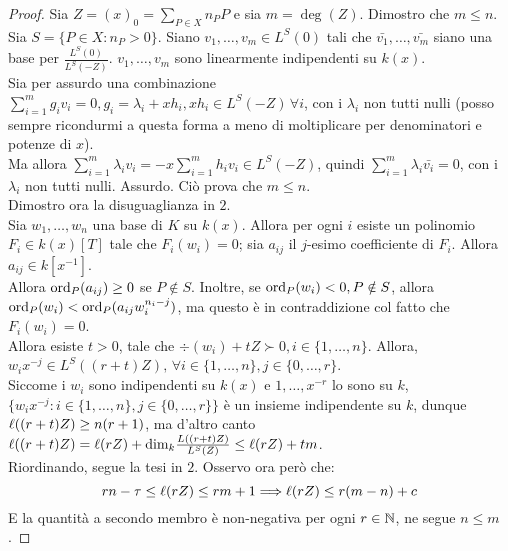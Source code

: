         \begin{proof}
            Sia $Z = (x)_0 = \sum_{P \in X}n_PP$ e sia $m = \deg(Z)$. Dimostro 
            che $m \leq n$. \\
            Sia $S = \{P \in X : n_P > 0\}$. Siano $v_1,\ldots,v_m \in L^S(0)$ 
            tali che $\bar{v_1},\ldots,\bar{v_m}$ siano una base per 
            $\frac{L^S(0)}{L^S(-Z)}$. $v_1,\ldots,v_m$ sono linearmente 
            indipendenti su $k(x)$.\\
            Sia per assurdo una combinazione $\sum_{i=1}^m g_iv_i = 0, g_i = 
            \lambda_i + xh_i, xh_i \in L^S(-Z) \, \forall i$, con i 
            $\lambda_i$ non tutti nulli (posso sempre ricondurmi a questa forma 
            a meno di moltiplicare per denominatori e potenze di $x$). \\
            Ma allora $\sum_{i=1}^m \lambda_i v_i = -x \sum_{i=1}^m h_i v_i 
            \in L^S(-Z)$, quindi $\sum_{i=1}^m \lambda_i \bar{v_i} = 0$, con i 
            $\lambda_i$ non tutti nulli. Assurdo. Ciò prova che $m \leq n$.\\
            Dimostro ora la disuguaglianza in $2$. \\
            Sia $w_1,\ldots,w_n$ una base di $K$ su $k(x)$. Allora per ogni $i$ 
            esiste un polinomio $F_i \in k(x)[T]$ tale che $F_i(w_i) = 0$; sia 
            $a_{ij}$ il $j$-esimo coefficiente di $F_i$. Allora $a_{ij} \in 
            k[x^{-1}]$.\\
            Allora $\text{ord}_P(a_{ij}) \geq 0$ se $P \notin S$. Inoltre, se 
            $\text{ord}_P(w_i) < 0, P \notin S$, allora $\text{ord}_P(w_i) < 
            \text{ord}_P(a_{ij}w_i^{n_i-j})$, ma questo è in contraddizione col 
            fatto che $F_i(w_i) = 0$.\\
            Allora esiste $t > 0$, tale che $\div(w_i) + tZ \succ 0, i \in 
            \{1,\ldots,n\}$. Allora, $w_ix^{-j} \in L^S((r+t)Z), \, \forall i 
            \in \{1,\ldots,n\}, j \in \{0,\ldots,r\}$.\\
            Siccome i $w_i$ sono indipendenti su $k(x)$ e $1,\ldots,x^{-r}$ 
            lo sono su $k$, $\{w_ix^{-j} : i \in \{1,\ldots,n\}, j \in 
            \{0,\ldots,r\}\}$ è un insieme indipendente su $k$, dunque 
            $\ell((r+t)Z) \geq n(r+1)$, ma d'altro canto $\ell((r+t)Z) = \ell(rZ) 
            + \text{dim}_k \frac{L((r+t)Z)}{L^S(Z)} \leq \ell(rZ) + tm$.\\
            Riordinando, segue la tesi in $2$. Osservo ora però che:
            \begin{equation*}
                rn -\tau \leq \ell(rZ) \leq rm + 1 \Longrightarrow \ell(rZ) \leq 
                r(m-n) + c    
            \end{equation*} 
            E la quantità a secondo membro è non-negativa per ogni $r \in \mathbb{N}$, 
            ne segue $n \leq m$.
        \end{proof}
    \newpage
